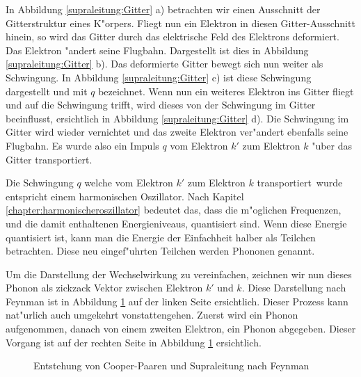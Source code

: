 \begin{refsection}
In Abbildung \ref{supraleitung:Gitter} a) betrachten wir einen Ausschnitt der Gitterstruktur eines K"orpers.
Fliegt nun ein Elektron in diesen Gitter-Ausschnitt hinein, so wird das Gitter durch das
elektrische Feld des Elektrons deformiert.
Das Elektron "andert seine Flugbahn.
Dargestellt ist dies in Abbildung \ref{supraleitung:Gitter} b).
Das deformierte Gitter bewegt sich nun weiter als Schwingung.
In Abbildung \ref{supraleitung:Gitter} c) ist diese Schwingung dargestellt und mit $q$ bezeichnet.
Wenn nun ein weiteres Elektron ins Gitter fliegt und auf die Schwingung trifft,
wird dieses von der Schwingung im Gitter beeinflusst, ersichtlich in Abbildung \ref{supraleitung:Gitter} d).
Die Schwingung im Gitter wird wieder vernichtet und das zweite Elektron ver"andert
ebenfalls seine Flugbahn.
Es wurde also ein Impuls $q$ vom Elektron $k'$ zum Elektron $k$ "uber das Gitter transportiert. 

Die Schwingung $q$ welche vom Elektron $k'$ zum Elektron $k$ \glqq transportiert\grqq~wurde
entspricht einem harmonischen Oszillator.
Nach Kapitel \ref{chapter:harmonischeroszillator} bedeutet das, dass die m"oglichen Frequenzen,
und die damit enthaltenen Energieniveaus, quantisiert sind.
Wenn diese Energie quantisiert ist, kann man die Energie der Einfachheit halber als Teilchen betrachten.
Diese neu eingef"uhrten Teilchen werden Phononen  genannt.

Um die Darstellung der Wechselwirkung zu vereinfachen, zeichnen wir nun dieses Phonon
als zickzack Vektor zwischen Elektron $k'$ und $k$. Diese Darstellung nach Feynman
ist in Abbildung \ref{supraleitung:FeynmanDiagram1} auf der linken Seite ersichtlich.
Dieser Prozess kann nat"urlich auch umgekehrt vonstattengehen.
Zuerst wird ein Phonon aufgenommen, danach von einem zweiten Elektron, ein Phonon abgegeben.
Dieser Vorgang ist auf der rechten Seite in Abbildung \ref{supraleitung:FeynmanDiagram1} ersichtlich.

\begin{figure} %
\centering

\caption{Entstehung von Cooper-Paaren und Supraleitung nach Feynman \cite{supraleitung:feynman}
\label{supraleitung:FeynmanDiagram1}}
\end{figure}


\end{refsection}
